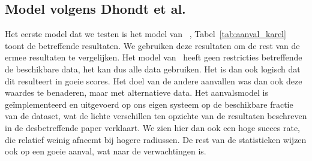 \subsection{Model volgens Dhondt et al.}
Het eerste model dat we testen is het model van
\citeauthor{Dhondt}~\cite{Dhondt}, Tabel~\ref{tab:aanval_karel} toont de
betreffende resultaten. We gebruiken deze resultaten om de rest van de ermee
resultaten te vergelijken. Het model van~\citeauthor{Dhondt} heeft geen
restricties betreffende de beschikbare data, het kan dus alle data gebruiken.
Het is dan ook logisch dat dit resulteert in goeie scores. Het doel van de
andere aanvallen was dan ook deze waardes te benaderen, maar met alternatieve
data. Het aanvalsmodel is geïmplementeerd en uitgevoerd op ons eigen systeem op
de beschikbare fractie van de dataset, wat de lichte verschillen ten opzichte
van de resultaten beschreven in de desbetreffende paper verklaart. We zien hier
dan ook een hoge succes rate, die relatief weinig afneemt bij hogere radiussen.
De rest van de statistieken wijzen ook op een goeie aanval, wat naar de
verwachtingen is.

